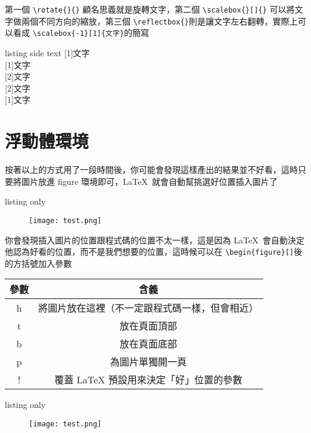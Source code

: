 第一個 \verb|\rotate{}{}| 顧名思義就是旋轉文字，第二個 \verb|\scalebox{}[]{}| 可以將文字做兩個不同方向的縮放，第三個 \verb|\reflectbox{}|則是讓文字左右翻轉，實際上可以看成 \verb|\scalebox{-1}[1]{文字}|的簡寫

\begin{tcblisting}{listing side text}
\scalebox{1}[1]{文字}\\
\scalebox{2}[1]{文字}\\
\scalebox{1}[2]{文字}\\
\scalebox{2}[2]{文字}\\
\scalebox{-1}[1]{文字}\\
\end{tcblisting}

\section{浮動體環境}

按著以上的方式用了一段時間後，你可能會發現這樣產出的結果並不好看，這時只要將圖片放進 figure 環境即可，\LaTeX\ 就會自動幫挑選好位置插入圖片了

\begin{tcblisting}{listing only}
\begin{figure}
\texttt{[image: test.png]}
\end{figure}
\end{tcblisting}

你會發現插入圖片的位置跟程式碼的位置不太一樣，這是因為 \LaTeX\ 會自動決定他認為好看的位置，而不是我們想要的位置，這時候可以在 \verb|\begin{figure}[]|後的方括號加入參數

\begin{tabular}{cc}
參數  & 含義 \\\hline\hline
 h  & 將圖片放在這裡（不一定跟程式碼一樣，但會相近） \\\hline
 t  & 放在頁面頂部 \\\hline
 b  & 放在頁面底部 \\\hline
 p  & 為圖片單獨開一頁 \\\hline
 !  & 覆蓋 LaTeX 預設用來決定「好」位置的參數 \\\hline
\end{tabular}

\begin{tcblisting}{listing only}
\begin{figure}[h]
\texttt{[image: test.png]}
\end{figure}
\end{tcblisting}

